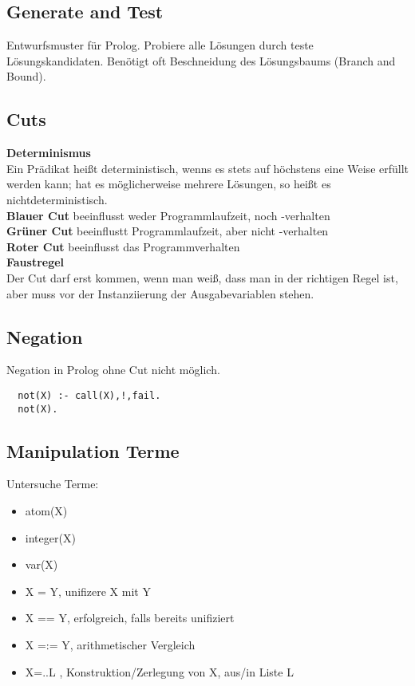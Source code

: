 \subsection{Generate and Test}
Entwurfsmuster für Prolog. Probiere alle Lösungen durch teste Lösungskandidaten. Benötigt oft Beschneidung des
Lösungsbaums (Branch and Bound).

\subsection{Cuts}
\textbf{Determinismus}\\
Ein Prädikat heißt deterministisch, wenns es stets auf höchstens eine Weise erfüllt werden kann; hat es
möglicherweise mehrere Lösungen, so heißt es nichtdeterministisch.\\

\textbf{Blauer Cut} beeinflusst weder Programmlaufzeit, noch -verhalten\\
\textbf{Grüner Cut} beeinflustt Programmlaufzeit, aber nicht -verhalten\\
\textbf{Roter Cut} beeinflusst das Programmverhalten\\

\textbf{Faustregel}\\
Der Cut darf erst kommen, wenn man weiß, dass man in der richtigen Regel ist, aber muss vor der
Instanziierung der Ausgabevariablen stehen.

\subsection{Negation}
Negation in Prolog ohne Cut nicht möglich.
\begin{lstlisting}
  not(X) :- call(X),!,fail.
  not(X).
\end{lstlisting}

\subsection{Manipulation Terme}
Untersuche Terme:
\begin{itemize}
  \item atom(X)
  \item integer(X)
  \item var(X)
  \item X = Y, unifizere X mit Y
  \item X == Y, erfolgreich, falls bereits unifiziert
  \item X =:= Y, arithmetischer Vergleich
  \item X=..L , Konstruktion/Zerlegung von X, aus/in Liste L
\end{itemize}

